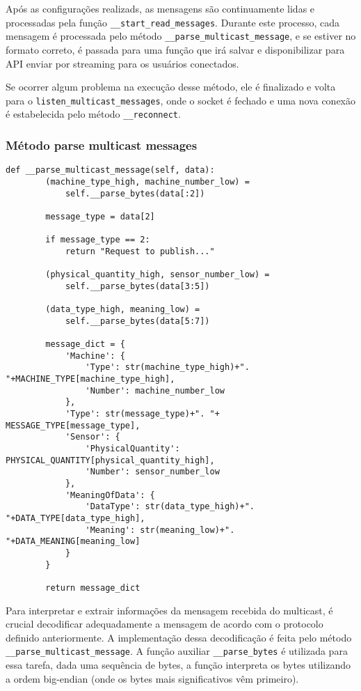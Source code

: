 Após as configurações realizads, as mensagens são continuamente lidas e processadas pela função \texttt{\_\_start\_read\_messages}. Durante este processo, cada mensagem é processada pelo método \texttt{\_\_parse\_multicast\_message}, e se estiver no formato correto, é passada para uma função que irá salvar e disponibilizar para \gls{API} enviar por streaming para os usuários conectados.

Se ocorrer algum problema na execução desse método, ele é finalizado e volta para o \texttt{listen\_multicast\_messages}, onde o socket é fechado e uma nova conexão é estabelecida pelo método \texttt{\_\_reconnect}.


\subsubsection[Método parse multicast messages]{Método parse multicast messages}


\begin{verbatim}
def __parse_multicast_message(self, data):
        (machine_type_high, machine_number_low) = 
            self.__parse_bytes(data[:2])

        message_type = data[2]

        if message_type == 2:
            return "Request to publish..."

        (physical_quantity_high, sensor_number_low) = 
            self.__parse_bytes(data[3:5])
        
        (data_type_high, meaning_low) = 
            self.__parse_bytes(data[5:7])

        message_dict = {
            'Machine': {
                'Type': str(machine_type_high)+". "+MACHINE_TYPE[machine_type_high],
                'Number': machine_number_low
            },
            'Type': str(message_type)+". "+ MESSAGE_TYPE[message_type],
            'Sensor': {
                'PhysicalQuantity': PHYSICAL_QUANTITY[physical_quantity_high],
                'Number': sensor_number_low
            },
            'MeaningOfData': {
                'DataType': str(data_type_high)+". "+DATA_TYPE[data_type_high],
                'Meaning': str(meaning_low)+". "+DATA_MEANING[meaning_low]
            }
        }

        return message_dict
    \end{verbatim}

Para interpretar e extrair informações da mensagem recebida do multicast, é crucial decodificar adequadamente a mensagem de acordo com o protocolo definido anteriormente. A implementação dessa decodificação é feita pelo método \texttt{\_\_parse\_multicast\_message}. A função auxiliar \texttt{\_\_parse\_bytes} é utilizada para essa tarefa, dada uma sequência de bytes, a função interpreta os bytes utilizando a ordem big-endian (onde os bytes mais significativos vêm primeiro).

